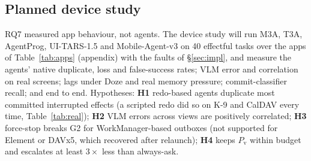 

\subsection{Planned device study}
\label{sec:device-plan}
RQ7 measured app behaviour, not agents. The device study will run M3A, T3A, AgentProg, UI-TARS-1.5 and Mobile-Agent-v3 on 40 effectful tasks over the apps of
Table~\ref{tab:apps} (appendix) with the faults of \S\ref{sec:impl}, and measure the agents' native duplicate, loss and false-success rates; VLM error and correlation on real screens;
lags under Doze and real memory pressure; commit-classifier recall; and \sys end to end. Hypotheses: \textbf{H1} redo-based agents duplicate most committed interrupted effects
(a scripted redo did so on K-9 and CalDAV every time, Table~\ref{tab:real}); \textbf{H2} VLM errors across views are positively correlated; \textbf{H3} force-stop breaks G2 for
WorkManager-based outboxes (not supported for Element or DAVx5, which recovered after relaunch); \textbf{H4} \sys keeps $P_{\mathrm{v}}$ within budget and escalates at least
$3\times$ less than always-ask.
